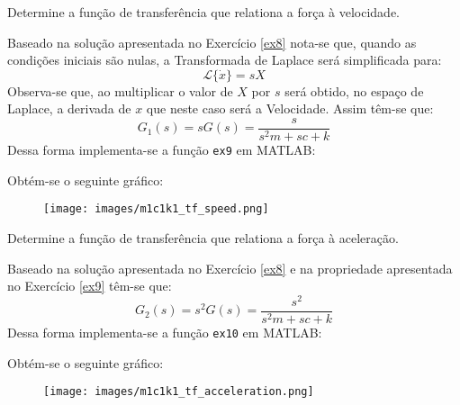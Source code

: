 \documentclass{article}
\begin{document}
\newpage
\begin{exercise}\label{ex9}
    Determine a função de transferência que relationa a força à velocidade.
\end{exercise}
\begin{resolution}
    Baseado na solução apresentada no Exercício \ref{ex8} nota-se que, quando as condições iniciais são nulas, a Transformada de Laplace será simplificada para:
    \begin{equation}
        \mathcal{L} \lbrace\dot{x}\rbrace = sX 
    \end{equation}
    Observa-se que, ao multiplicar o valor de $X$ por $s$ será obtido, no espaço de Laplace, a derivada de $x$ que neste caso será a Velocidade. Assim têm-se que:
    \begin{equation}
        \boxed{G_{1}(s) = s G(s) = \frac{s}{s^2m + sc + k}}
    \end{equation}
    Dessa forma implementa-se a função \texttt{ex9} em MATLAB:
    \begin{scriptsize}
        \myMatlab
    \end{scriptsize}
    Obtém-se o seguinte gráfico:
    \begin{figure}[H]
        \centering
        \texttt{[image: images/m1c1k1\_tf\_speed.png]}
    \end{figure}
\end{resolution}

\newpage
\begin{exercise}\label{ex10}
    Determine a função de transferência que relationa a força à aceleração.
\end{exercise}
\begin{resolution}
    Baseado na solução apresentada no Exercício \ref{ex8} e na propriedade apresentada no Exercício \ref{ex9} têm-se que:
    \begin{equation}
        \boxed{G_{2}(s) = s^2 G(s) = \frac{s^2}{s^2m + sc + k}}
    \end{equation}
    Dessa forma implementa-se a função \texttt{ex10} em MATLAB:
    \begin{scriptsize}
        \myMatlab
    \end{scriptsize}
    Obtém-se o seguinte gráfico:
    \begin{figure}[H]
        \centering
        \texttt{[image: images/m1c1k1\_tf\_acceleration.png]}
    \end{figure}
\end{resolution}
\end{document}
